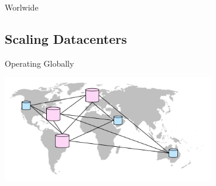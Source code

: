 \documentclass[aspectratio=169]{beamer}
\begin{document}
{
\begin{frame}{Worlwide}
\end{frame}
}

\subsection{Scaling Datacenters}

\begin{frame}{Operating Globally}
    \begin{center}
        \includegraphics[width=0.7\textwidth]{images/worldmapdc.png}
    \end{center}
\end{frame}
\end{document}
